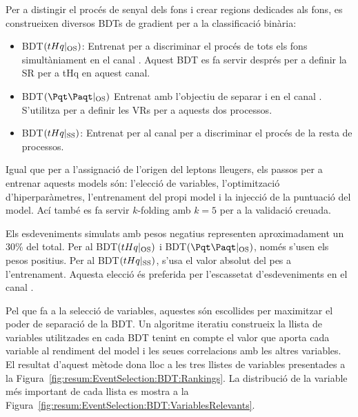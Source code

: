 Per a distingir el procés de senyal \tHq dels fons i crear regions dedicades als fons,
es construeixen diversos BDTs de gradient per a la classificació binària:
\begin{itemize}
	\item BDT$(tHq|_{\text{OS}})$: Entrenat per a discriminar el procés \tHq de tots els fons simultàniament
		en el canal \dilepOStau. Aquest BDT es fa servir després per a definir la SR per a tHq en aquest canal.
	\item BDT$(\ttbar|_{\text{OS}})$ Entrenat amb l'objectiu de separar \ttbar i \Zjets en el canal \dilepOStau. 
		S'utilitza per a definir les VRs per a aquests dos processos.
	\item BDT$(tHq|_{\text{SS}})$: Entrenat per al canal \dilepSStau per a discriminar el procés \tHq de la resta 
		de processos.
\end{itemize}

Igual que per a l'assignació de l'origen del leptons lleugers, els passos per a entrenar 
aquests models són: l'elecció de variables, l'optimització d'hiperparàmetres, l'entrenament 
del propi model i la injecció de la puntuació del model. Ací també es fa servir $k$-folding amb
$k=5$ per a la validació creuada.

Els esdeveniments simulats amb pesos negatius representen aproximadament un 30\% del total.
Per al BDT$(tHq|_{\text{OS}})$ i BDT$(\ttbar|_{\text{OS}})$, només s'usen els pesos positius.
Per al BDT$(tHq|_{\text{SS}})$, s'usa el valor absolut del pes a l'entrenament.
Aquesta elecció és preferida per l'escassetat d'esdeveniments en el canal \dilepSStau.

Pel que fa a la selecció de variables, aquestes són escollides per maximitzar el poder
de separació de la BDT. Un algoritme iteratiu construeix la llista de variables utilitzades
en cada BDT tenint en compte el valor que aporta cada variable al rendiment del model
i les seues correlacions amb les altres variables. El resultat d'aquest mètode dona lloc
a les tres llistes de variables presentades a la Figura~\ref{fig:resum:EventSelection:BDT:Rankings}.
La distribució de la variable més important de cada llista es mostra a la Figura~\ref{fig:resum:EventSelection:BDT:VariablesRelevants}.

